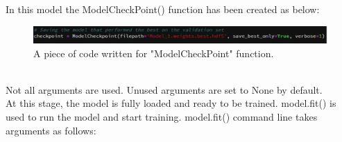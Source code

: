 \begin{itemize}
\begin{itemize}
\end{itemize}
In this model the ModelCheckPoint() function has been created as below:
\begin{figure}[ht]
    \centering
    \includegraphics{Figures/ef1}
    \decoRule
    \caption [A piece of code written for "ModelCheckPoint" function.]{A piece of code written for "ModelCheckPoint" function.}
    \label{fig:la}
    \end{figure}\hfill \\
    Not all arguments are used. Unused arguments are set to None by default.\\

At this stage, the model is fully loaded and ready to be trained. model.fit() is used to run the model and start training. 
model.fit() command line takes arguments as follows:\\
\noindent{}
\end{itemize}
